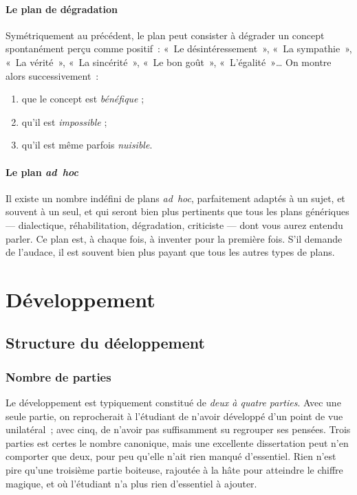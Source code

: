 \documentclass[a4paper]{article}
\begin{document}
\paragraph{Le plan de dégradation}
\label{sec-2-4-2-4}


Symétriquement au précédent, le plan peut consister à dégrader un
concept spontanément perçu comme positif : « Le désintéressement », « La
sympathie », « La vérité », « La sincérité », « Le bon goût », « L'égalité »\ldots{}
On montre alors successivement :

\begin{enumerate}
\item que le concept est \emph{bénéfique} ;
\item qu'il est \emph{impossible} ;
\item qu'il est même parfois \emph{nuisible}.
\end{enumerate}
\paragraph{Le plan \emph{ad hoc}}
\label{sec-2-4-2-5}


Il existe un nombre indéfini de plans \emph{ad hoc}, parfaitement adaptés à
un sujet, et souvent à un seul, et qui seront bien plus pertinents que
tous les plans génériques --- dialectique, réhabilitation, dégradation,
criticiste --- dont vous aurez entendu parler. Ce plan est, à chaque
fois, à inventer pour la première fois. S'il demande de l'audace, il est
souvent bien plus payant que tous les autres types de plans.
\section{Développement}
\label{sec-3}
\subsection{Structure du déeloppement}
\label{sec-3-1}
\subsubsection{Nombre de parties}
\label{sec-3-1-1}


Le développement est typiquement constitué de \emph{deux à quatre parties}.
Avec une seule partie, on reprocherait à l'étudiant de n'avoir développé
d'un point de vue unilatéral ; avec cinq, de n'avoir pas suffisamment su
regrouper ses pensées. Trois parties est certes le nombre canonique,
mais une excellente dissertation peut n'en comporter que deux, pour peu
qu'elle n'ait rien manqué d'essentiel. Rien n'est pire qu'une troisième
partie boiteuse, rajoutée à la hâte pour atteindre le chiffre magique,
et où l'étudiant n'a plus rien d'essentiel à ajouter.
\end{document}
